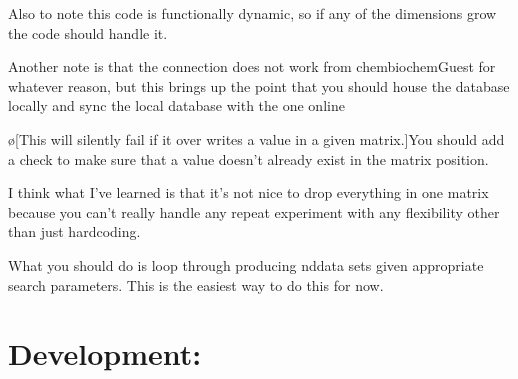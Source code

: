 \documentclass[10pt]{book}
\begin{document}
Also to note this code is functionally dynamic, so if any of the dimensions grow the code should handle it.

Another note is that the connection does not work from chembiochemGuest for whatever reason, but this brings up the point that you should house the database locally and sync the local database with the one online 

\o[This will silently fail if it over writes a value in a given matrix.]{You should add a check to make sure that a value doesn't already exist in the matrix position.}

I think what I've learned is that it's not nice to drop everything in one matrix because you can't really handle any repeat experiment with any flexibility other than just hardcoding.

What you should do is loop through producing nddata sets given appropriate search parameters. This is the easiest way to do this for now. 

\chapter{Development:}
\end{document}
